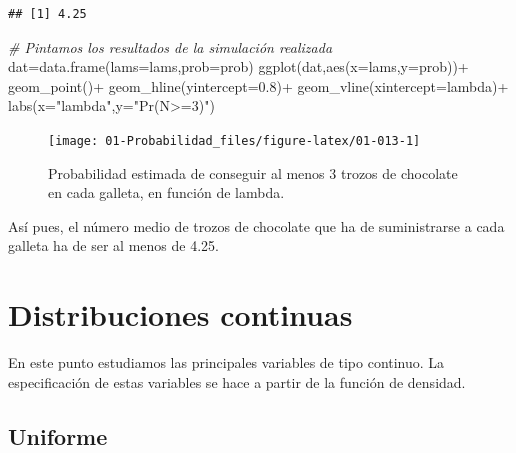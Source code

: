 \documentclass[
]{book}
\newenvironment{Shaded}{\begin{snugshade}}{\end{snugshade}}
\newcommand{\AttributeTok}[1]{\textcolor[rgb]{0.77,0.63,0.00}{#1}}
\newcommand{\CommentTok}[1]{\textcolor[rgb]{0.56,0.35,0.01}{\textit{#1}}}
\newcommand{\FloatTok}[1]{\textcolor[rgb]{0.00,0.00,0.81}{#1}}
\newcommand{\FunctionTok}[1]{\textcolor[rgb]{0.00,0.00,0.00}{#1}}
\newcommand{\NormalTok}[1]{#1}
\newcommand{\OtherTok}[1]{\textcolor[rgb]{0.56,0.35,0.01}{#1}}
\newcommand{\SpecialCharTok}[1]{\textcolor[rgb]{0.00,0.00,0.00}{#1}}
\newcommand{\StringTok}[1]{\textcolor[rgb]{0.31,0.60,0.02}{#1}}
\theoremstyle{definition}
\theoremstyle{definition}
\theoremstyle{definition}
\theoremstyle{definition}
\theoremstyle{remark}
\begin{document}
\begin{verbatim}
## [1] 4.25
\end{verbatim}

\begin{Shaded}
\begin{Highlighting}[]
\CommentTok{\# Pintamos los resultados de la simulación realizada}
\NormalTok{dat}\OtherTok{=}\FunctionTok{data.frame}\NormalTok{(}\AttributeTok{lams=}\NormalTok{lams,}\AttributeTok{prob=}\NormalTok{prob)}
\FunctionTok{ggplot}\NormalTok{(dat,}\FunctionTok{aes}\NormalTok{(}\AttributeTok{x=}\NormalTok{lams,}\AttributeTok{y=}\NormalTok{prob))}\SpecialCharTok{+}
  \FunctionTok{geom\_point}\NormalTok{()}\SpecialCharTok{+}
  \FunctionTok{geom\_hline}\NormalTok{(}\AttributeTok{yintercept=}\FloatTok{0.8}\NormalTok{)}\SpecialCharTok{+}
  \FunctionTok{geom\_vline}\NormalTok{(}\AttributeTok{xintercept=}\NormalTok{lambda)}\SpecialCharTok{+}
  \FunctionTok{labs}\NormalTok{(}\AttributeTok{x=}\StringTok{"lambda"}\NormalTok{,}\AttributeTok{y=}\StringTok{"Pr(N\textgreater{}=3)"}\NormalTok{)}
\end{Highlighting}
\end{Shaded}

\begin{figure}

{\centering \texttt{[image: 01-Probabilidad\_files/figure-latex/01-013-1]} 

}

\caption{Probabilidad estimada de conseguir al menos 3 trozos de chocolate en cada galleta, en función de lambda.}\label{fig:01-013}
\end{figure}

Así pues, el número medio de trozos de chocolate que ha de suministrarse a cada galleta ha de ser al menos de 4.25.

\hypertarget{distribuciones-continuas}{%
\section{Distribuciones continuas}\label{distribuciones-continuas}}

En este punto estudiamos las principales variables de tipo continuo. La especificación de estas variables se hace a partir de la función de densidad.

\hypertarget{uniforme}{%
\subsection{Uniforme}\label{uniforme}}
\end{document}
